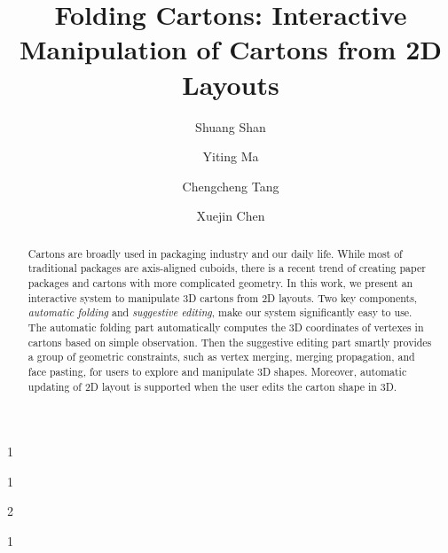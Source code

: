 \documentclass[submission]{gmp2018}
\begin{document}
%
%
\title{Folding Cartons: Interactive Manipulation of Cartons from 2D Layouts}

%
%

%
%
\author{Shuang Shan}{1}
\author{Yiting Ma}{1}
\author{Chengcheng Tang}{2}
\author{Xuejin Chen}{1}

%
%

%
%
 



\newcommand{\comments}[1]{}
\newcommand{\cxj}[1]{\textcolor{red}{(xuejin:#1)}}
\newcommand{\xjmd}[1]{\textcolor{purple}{#1}}
\newcommand{\vo}{\hat{\mathbf{v}}}
\newcommand{\vn}{\mathbf{v}}
\newcommand{\vset}{\mathbb{V}}


\maketitle

\begin{abstract}
Cartons are broadly used in packaging industry and our daily life. While most of traditional packages are axis-aligned cuboids, there is a recent trend of creating paper packages and cartons with more complicated geometry. In this work, we present an interactive system to manipulate 3D cartons from 2D layouts. Two key components, \emph{automatic folding} and \emph{suggestive editing}, make our system significantly easy to use. 
The automatic folding part automatically computes the 3D coordinates of vertexes in cartons based on simple observation. Then the suggestive editing part smartly provides a group of geometric constraints, such as vertex merging, merging propagation, and face pasting, for users to explore and manipulate 3D shapes.
Moreover, automatic updating of 2D layout is supported when the user edits the carton shape in 3D.  
\end{abstract}
\end{document}
